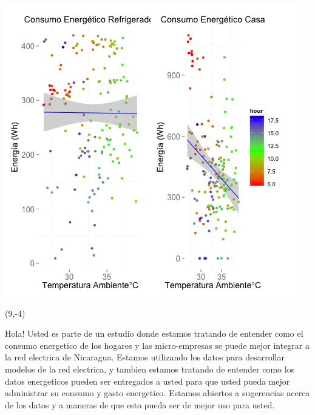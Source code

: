 \documentclass{article}\usepackage[]{graphicx}\usepackage[]{color}
\newenvironment{knitrout}{}{} %
\begin{document}
\begin{knitrout}
\color{fgcolor}
\includegraphics[scale=0.75]{figure/A23_correlaciones} 
\end{knitrout}

 \begin{textblock}{1}(9,-4)
\begin{minipage}{20em}
\begingroup

\endgroup
\end{minipage}
\end{textblock}

\vspace{70px}
\begin{knitrout}
Hola! Usted es parte de un estudio donde estamos tratando de entender como el consumo energetico de los hogares y las micro-empresas se puede mejor integrar a la red electrica de Nicaragua. Estamos utilizando los datos para desarrollar modelos de la red electrica, y tambien estamos tratando de entender como los datos energeticos pueden ser entregados a usted para que usted pueda mejor administrar su consumo y gasto energetico.  Estamos abiertos a sugerencias acerca de los datos y a maneras de que esto pueda ser de mejor uso para usted.
\end{knitrout}
\end{document}
